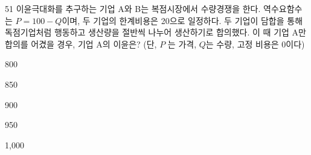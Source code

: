 \begin{question}{51}
이윤극대화를 추구하는 기업 A와 B는 복점시장에서 수량경쟁을 한다. 역수요함수는 $P=100-Q$이며, 두 기업의 한계비용은 20으로 일정하다. 두 기업이 담합을 통해 독점기업처럼 행동하고 생산량을 절반씩 나누어 생산하기로 합의했다. 이 때 기업 A만 합의를 어겼을 경우, 기업 A의 이윤은? (단, $P$ 는 가격, $Q$는 수량, 고정 비용은 0이다)
\begin{choices}
  \item 800
  \item 850
  \item 900
  \item 950
  \item 1,000
\end{choices}
\end{question}
